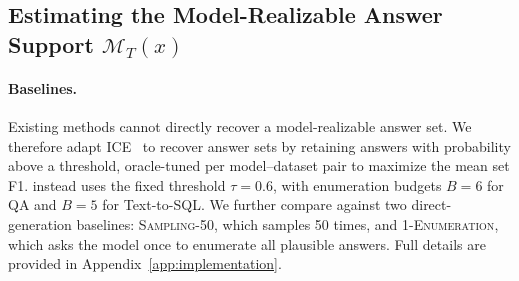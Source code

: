 \begin{table}[t]
    \centering
    \caption{\textbf{Model-realizable answer support recovery on QA and Text-to-SQL.}
    We report mean per-question set $F_1 \pm$ standard deviation and exact set match (EM). \textcolor{colfirst}{Best} and \textcolor{colsecond}{second-best} results are highlighted.}
    \label{tab:qa_set_recovery}
    \vspace{3pt}
    \setlength{\tabcolsep}{2pt}
    \resizebox{1\columnwidth}{!}{%
    
    }
    \vspace{-2em}
\end{table}

\subsection{Estimating the Model-Realizable Answer Support $\mathcal{M}_T(x)$}
\label{sec:set-recovery}



\paragraph{Baselines.}
Existing methods cannot directly recover a model-realizable answer set. We therefore adapt ICE~\citep{pmlr-v235-hou24b} to recover answer sets by retaining answers with probability above a threshold, oracle-tuned per model--dataset pair to maximize the mean set F1. \circleclar{} instead uses the fixed threshold $\tau=0.6$, with enumeration budgets $B=6$ for QA and $B=5$ for Text-to-SQL. We further compare against two direct-generation baselines: \textsc{Sampling-50}, which samples 50 times, and \textsc{1-Enumeration}, which asks the model once to enumerate all plausible answers. Full details are provided in Appendix~\ref{app:implementation}.




